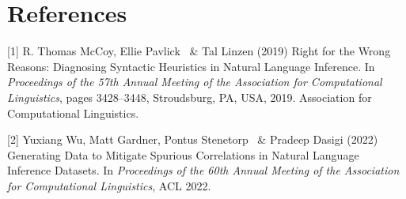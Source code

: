 \documentclass{article}
\begin{document}
\section*{References}

{
\small

\label{ref1}
[1] R. Thomas McCoy, Ellie Pavlick \ \& Tal Linzen (2019) Right for the Wrong Reasons: Diagnosing Syntactic Heuristics in Natural Language Inference. In {\it Proceedings of the 57th Annual Meeting of the Association for Computational Linguistics}, pages 3428–3448, Stroudsburg, PA, USA, 2019. Association for Computational Linguistics.

\label{ref2}
[2] Yuxiang Wu, Matt Gardner, Pontus Stenetorp \ \& Pradeep Dasigi (2022) Generating Data to Mitigate Spurious Correlations in Natural Language Inference Datasets. In {\it Proceedings of the 60th Annual Meeting of the Association for Computational Linguistics}, ACL 2022.
}

\end{document}
